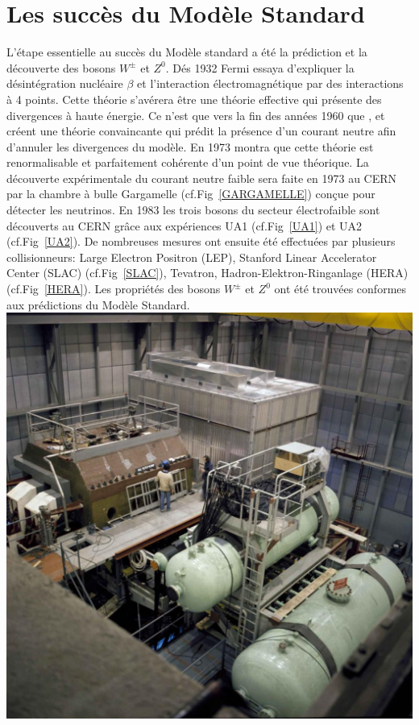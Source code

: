 \section{Les succès du Modèle Standard}
L'étape essentielle au succès du Modèle standard a été la prédiction et la découverte des bosons $W^{\pm}$ et $Z^{0}$. Dés \num{1932} Fermi essaya d'expliquer la désintégration nucléaire $\beta$ et l'interaction électromagnétique par des interactions à \num{4} points. Cette théorie  s'avérera être une théorie effective qui présente des divergences à haute énergie. Ce n'est que vers la fin des années \num{1960} que ,  et  créent une théorie convaincante qui prédit la présence d'un courant neutre afin d'annuler les divergences du modèle. En \num{1973}  montra que cette théorie est renormalisable et parfaitement cohérente d'un point de vue théorique. La découverte expérimentale du courant neutre faible sera faite en \num{1973} au CERN par la chambre à bulle Gargamelle (cf.Fig~\ref{GARGAMELLE}) conçue pour détecter les neutrinos. En \num{1983} les trois bosons du secteur électrofaible sont découverts au CERN grâce aux expériences UA1 (cf.Fig~\ref{UA1}) et UA2 (cf.Fig~\ref{UA2}). De nombreuses mesures ont ensuite été effectuées par plusieurs collisionneurs: Large Electron Positron (LEP), Stanford Linear Accelerator Center (SLAC) (cf.Fig~\ref{SLAC}), Tevatron, Hadron-Elektron-Ringanlage (HERA) (cf.Fig~\ref{HERA}). Les propriétés des bosons $W^{\pm}$ et $Z^{0}$ ont été trouvées conformes aux prédictions du Modèle Standard. 
\marginpar
{
	\centering
	\includegraphics[width=\marginparwidth]{SM/gargamelle.jpg}
	\label{GARGAMELLE}
}
